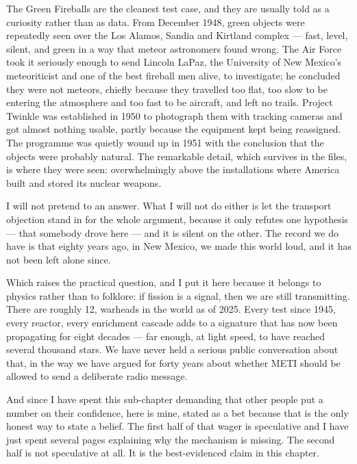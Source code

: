 \begin{funfact}
The Green Fireballs are the cleanest test case, and they are usually told as a curiosity rather than
as data. From December 1948, green objects were repeatedly seen over the Los Alamos, Sandia and
Kirtland complex --- fast, level, silent, and green in a way that meteor astronomers found wrong. The
Air Force took it seriously enough to send Lincoln LaPaz, the University of New Mexico's meteoriticist
and one of the best fireball men alive, to investigate; he concluded they were not meteors, chiefly
because they travelled too flat, too slow to be entering the atmosphere and too fast to be aircraft,
and left no trails. Project Twinkle was established in 1950 to photograph them with tracking cameras
and got almost nothing usable, partly because the equipment kept being reassigned. The programme was
quietly wound up in 1951 with the conclusion that the objects were probably natural. The remarkable
detail, which survives in the files, is where they were seen: overwhelmingly above the installations
where America built and stored its nuclear weapons.
\end{funfact}

I will not pretend to an answer. What I will not do either is let the transport objection stand in
for the whole argument, because it only refutes one hypothesis --- that somebody drove here --- and
it is silent on the other.  The record we do have is that eighty years ago, in New Mexico, we made this world loud, and it
has not been left alone since.

Which raises the practical question, and I put it here because it belongs to physics rather than to
folklore: if fission is a signal, then we are still transmitting. There are roughly 12, warheads
in the world as of 2025. Every test since 1945, every reactor, every enrichment cascade adds to a
signature that has now been propagating for eight decades --- far enough, at light speed, to have
reached several thousand stars. We have never held a serious public conversation about that, in the
way we have argued for forty years about whether METI should be allowed to send a deliberate radio
message. 

And since I have spent this sub-chapter demanding that other people put a number on their
confidence, here is mine, stated as a bet because that is the only honest way to state a belief.
 The
first half of that wager is speculative and I have just spent several pages explaining why the
mechanism is missing. The second half is not speculative at all. It is the best-evidenced claim in
this chapter.


